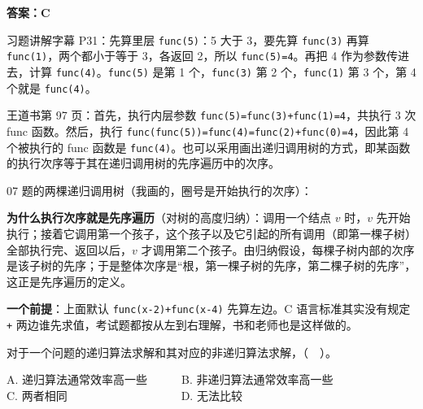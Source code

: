 \documentclass[10.5pt,a4paper,oneside]{article}
\newcommand{\hlred}[1]{\textcolor{wdred}{\bfseries #1}}
\begin{document}
\hlred{\textbf{答案：C}}

\begin{videobox}

习题讲解字幕 P31：先算里层 \texttt{func(5)}：5 大于 3，要先算
\texttt{func(3)} 再算 \texttt{func(1)}，两个都小于等于 3，各返回 2，所以
\texttt{func(5)=4}。再把 4 作为参数传进去，计算
\texttt{func(4)}。\texttt{func(5)} 是第 1 个，\texttt{func(3)} 第 2
个，\texttt{func(1)} 第 3 个，第 4 个就是 \texttt{func(4)}。

\end{videobox}

\begin{jiexibox}

王道书第 97 页：首先，执行内层参数
\texttt{func(5)=func(3)+func(1)=4}，共执行 3 次 func 函数。然后，执行
\texttt{func(func(5))=func(4)=func(2)+func(0)=4}，因此第 4 个被执行的
func 函数是
\texttt{func(4)}。也可以采用画出递归调用树的方式，即某函数的执行次序等于其在递归调用树的先序遍历中的次序。

\end{jiexibox}


07 题的两棵递归调用树（我画的，圈号是开始执行的次序）：

\begin{figure}[!ht]\centering{}\end{figure}

\begin{addbox}

\textbf{为什么执行次序就是先序遍历}（对树的高度归纳）：调用一个结点
\(v\) 时，\(v\)
先开始执行；接着它调用第一个孩子，这个孩子以及它引起的所有调用（即第一棵子树）全部执行完、返回以后，\(v\)
才调用第二个孩子。由归纳假设，每棵子树内部的次序是该子树的先序；于是整体次序是“根，第一棵子树的先序，第二棵子树的先序”，这正是先序遍历的定义。

\textbf{一个前提}：上面默认 \texttt{func(x-2)+func(x-4)} 先算左边。C
语言标准其实没有规定 \texttt{+}
两边谁先求值，考试题都按从左到右理解，书和老师也是这样做的。

\end{addbox}

\begin{questionbox}[08]

对于一个问题的递归算法求解和其对应的非递归算法求解，（　）。

A. 递归算法通常效率高一些　　　B. 非递归算法通常效率高一些\\
C. 两者相同　　　　　　　　　　D. 无法比较

\end{questionbox}
\end{document}
